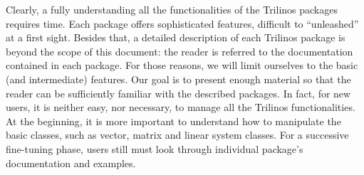 Clearly, a fully understanding all the functionalities of the Trilinos
packages requires time.  Each package offers sophisticated features,
difficult to ``unleashed'' at a first sight.  Besides that, a detailed
description of each Trilinos package is beyond the scope of this
document: the reader is referred to the documentation contained in each
package. For those reasons, we will limit ourselves to the basic (and
intermediate) features. Our goal is to present enough material so that
the reader can be sufficiently familiar with the described packages.  In
fact, for new users, it is neither easy, nor necessary, to manage all
the Trilinos functionalities.  At the beginning, it is more important to
understand how to manipulate the basic classes, such as vector, matrix
and linear system classes.  For a successive fine-tuning phase, users
still must look through individual package's documentation and examples.

\medskip

